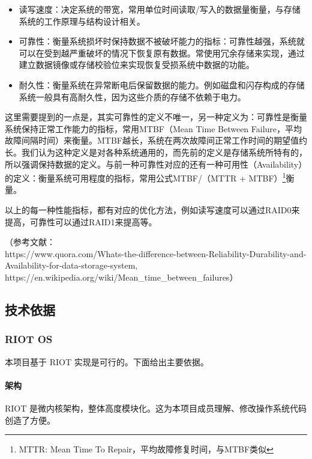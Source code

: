 \documentclass{ctexart}
\begin{document}
\begin{itemize}
    \item 读写速度：决定系统的带宽，常用单位时间读取/写入的数据量衡量，与存储系统的工作原理与结构设计相关。
    \item 可靠性：衡量系统损坏时保持数据不被破坏能力的指标：可靠性越强，系统就可以在受到越严重破坏的情况下恢复原有数据。常使用冗余存储来实现，通过建立数据镜像或存储校验位来实现恢复受损系统中数据的功能。
    \item 耐久性：衡量系统在异常断电后保留数据的能力。例如磁盘和闪存构成的存储系统一般具有高耐久性，因为这些介质的存储不依赖于电力。
\end{itemize}

这里需要提到的一点是，其实可靠性的定义不唯一，另一种定义为：可靠性是衡量系统保持正常工作能力的指标，常用MTBF（Mean Time Between Failure，平均故障间隔时间）来衡量。MTBF越长，系统在两次故障间正常工作时间的期望值约长。我们认为这种定义是对各种系统通用的，而先前的定义是存储系统所特有的，所以强调保持数据的定义。与前一种可靠性对应的还有一种可用性（Availability）的定义：衡量系统可用程度的指标，常用公式MTBF/（MTTR + MTBF）\footnote{MTTR: Mean Time To Repair，平均故障修复时间，与MTBF类似}衡量。

以上的每一种性能指标，都有对应的优化方法，例如读写速度可以通过RAID0来提高，可靠性可以通过RAID1来提高等。

（参考文献：\\
https://www.quora.com/Whats-the-difference-between-Reliability-Durability-and-Availability-for-data-storage-system, \\ https://en.wikipedia.org/wiki/Mean\_time\_between\_failures）

\subsection{技术依据}
\subsubsection{RIOT OS}
本项目基于 RIOT 实现是可行的。下面给出主要依据。

\paragraph{架构}
RIOT 是微内核架构，整体高度模块化。这为本项目成员理解、修改操作系统代码创造了方便。
\end{document}
